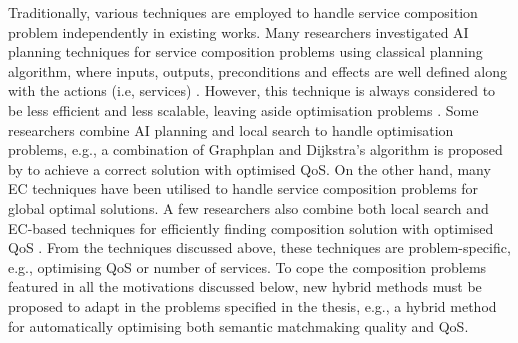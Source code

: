 Traditionally, various techniques are employed to handle service composition problem independently in existing works. Many researchers investigated AI planning techniques for service composition problems using classical planning algorithm, where inputs, outputs, preconditions and effects are well defined along with the actions (i.e, services) \cite{markou2015non,peer2005web}. However, this technique is always considered to be less efficient and less scalable, leaving aside optimisation problems \cite{parejo2008qos}. Some researchers combine AI planning and local search to handle optimisation problems, e.g., a combination of Graphplan \cite{blum1997fast} and Dijkstra’s algorithm is proposed by \cite{feng2013dynamic} to achieve a correct solution with optimised QoS. On the other hand, many EC techniques have been utilised to handle service composition problems for global optimal solutions. A few researchers also combine both local search and EC-based techniques for efficiently finding composition solution with optimised QoS \cite{parejo2008qos}. From the techniques discussed above, these techniques are problem-specific, e.g., optimising QoS or number of services. To cope the composition problems featured in all the motivations discussed below, new hybrid methods must be proposed to adapt in the problems specified in the thesis, e.g., a hybrid method for automatically optimising both semantic matchmaking quality and QoS. 

